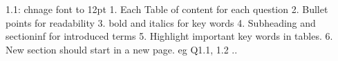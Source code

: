 

1.1: chnage font to 12pt
1. Each Table of content for each question
2. Bullet points for readability
3. bold and italics for key words
4. Subheading and sectioninf for introduced terms 
5. Highlight important key words in tables. 
6. New section should start in a new page. eg Q1.1, 1.2 .. 